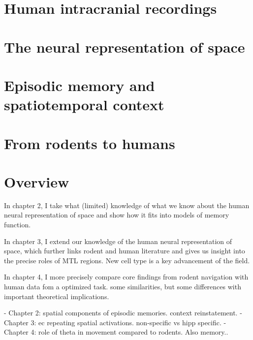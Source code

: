 \section{Human intracranial recordings}
\section{The neural representation of space}
\section{Episodic memory and spatiotemporal context}
\section{From rodents to humans}
\section{Overview}

In chapter 2, I take what (limited) knowledge of what we know about the human neural representation of space and show how it fits into models of memory function.

In chapter 3, I extend our knowledge of the human neural representation of space, which further links rodent and human literature and gives us insight into the precise roles of MTL regions. New cell type is a key advancement of the field.

In chapter 4, I more precisely compare core findings from rodent navigation with human data fom a optimized task. some similarities, but some differences with important theoretical implications.

- Chapter 2: spatial components of episodic memories. context reinstatement.
- Chapter 3: ec repeating spatial activations. non-specific vs hipp specific.
- Chapter 4: role of theta in movement compared to rodents. Also memory..
